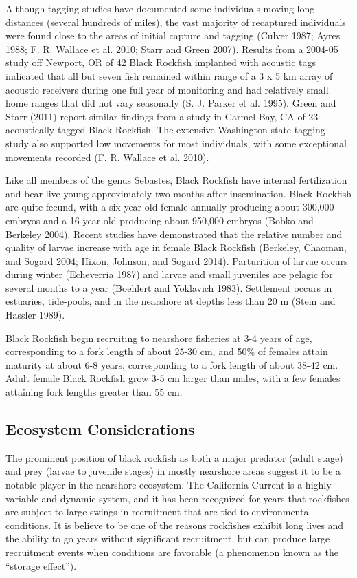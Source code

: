 \documentclass[11pt,
  english,
  letterpaper,
]{article}
\begin{document}
Although tagging studies have documented some individuals moving long distances (several hundreds of miles), the vast majority of recaptured individuals were found close to the areas of initial capture and tagging (Culver 1987; Ayres 1988; F. R. Wallace et al. 2010; Starr and Green 2007). Results from a 2004-05 study off Newport, OR of 42 Black Rockfish implanted with acoustic tags indicated that all but seven fish remained within range of a 3 x 5 km array of acoustic receivers during one full year of monitoring and had relatively small home ranges that did not vary seasonally (S. J. Parker et al. 1995). Green and Starr (2011) report similar findings from a study in Carmel Bay, CA of 23 acoustically tagged Black Rockfish. The extensive Washington state tagging study also supported low movements for most individuals, with some exceptional movements recorded (F. R. Wallace et al. 2010).

Like all members of the genus Sebastes, Black Rockfish have internal fertilization and bear live young approximately two months after insemination. Black Rockfish are quite fecund, with a six-year-old female annually producing about 300,000 embryos and a 16-year-old producing about 950,000 embryos (Bobko and Berkeley 2004). Recent studies have demonstrated that the relative number and quality of larvae increase with age in female Black Rockfish (Berkeley, Chaoman, and Sogard 2004; Hixon, Johnson, and Sogard 2014). Parturition of larvae occurs during winter (Echeverria 1987) and larvae and small juveniles are pelagic for several months to a year (Boehlert and Yoklavich 1983). Settlement occurs in estuaries, tide-pools, and in the nearshore at depths less than 20 m (Stein and Hassler 1989).

Black Rockfish begin recruiting to nearshore fisheries at 3-4 years of age, corresponding to a fork length of about 25-30 cm, and 50\% of females attain maturity at about 6-8 years, corresponding to a fork length of about 38-42 cm. Adult female Black Rockfish grow 3-5 cm larger than males, with a few females attaining fork lengths greater than 55 cm.

\hypertarget{ecosystem-considerations-1}{%
\subsection{Ecosystem Considerations}\label{ecosystem-considerations-1}}

The prominent position of black rockfish as both a major predator (adult stage) and prey (larvae to juvenile stages) in mostly nearshore areas suggest it to be a notable player in the nearshore ecosystem. The California Current is a highly variable and dynamic system, and it has been recognized for years that rockfishes are subject to large swings in recruitment that are tied to environmental conditions. It is believe to be one of the reasons rockfishes exhibit long lives and the ability to go years without significant recruitment, but can produce large recruitment events when conditions are favorable (a phenomenon known as the ``storage effect'').
\end{document}
